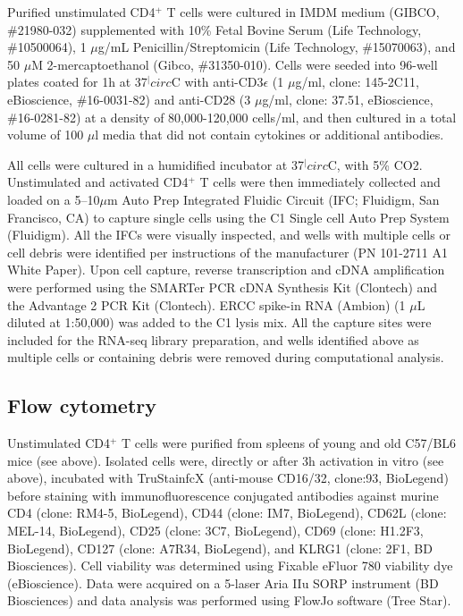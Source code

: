 Purified unstimulated CD4$^+$ T cells were cultured in IMDM medium (GIBCO, \#{}21980-032) supplemented with 10\% Fetal Bovine Serum (Life Technology, \#{}10500064), 1 $\mu$g/mL Penicillin/Streptomicin (Life Technology, \#{}15070063), and 50 $\mu$M 2-mercaptoethanol (Gibco, \#{}31350-010). Cells were seeded into 96-well plates coated for 1h at 37$^|circ$C with anti-CD3$\epsilon$ (1 $\mu$g/ml, clone: 145-2C11, eBioscience, \#{}16-0031-82) and anti-CD28 (3 $\mu$g/ml, clone: 37.51, eBioscience, \#{}16-0281-82) at a density of 80,000-120,000 cells/ml, and then cultured in a total volume of 100 $\mu$l media that did not contain cytokines or additional antibodies.  

All cells were cultured in a humidified incubator at 37$^|circ$C, with 5\% CO2. Unstimulated and activated CD4$^+$ T cells were then immediately collected and loaded on a 5–10$\mu$m Auto Prep Integrated Fluidic Circuit (IFC; Fluidigm, San Francisco, CA) to capture single cells using the C1 Single cell Auto Prep System (Fluidigm). All the IFCs were visually inspected, and wells with multiple cells or cell debris were identified per instructions of the manufacturer (PN 101-2711 A1 White Paper). Upon cell capture, reverse transcription and cDNA amplification were performed using the SMARTer PCR cDNA Synthesis Kit (Clontech) and the Advantage 2 PCR Kit (Clontech). ERCC spike-in RNA (Ambion) (1 $\mu$L diluted at 1:50,000) was added to the C1 lysis mix. All the capture sites were included for the RNA-seq library preparation, and wells identified above as multiple cells or containing debris were removed during computational analysis.

\subsection{Flow cytometry}
\label{appA.1:FACS}

Unstimulated CD4$^+$ T cells were purified from spleens of young and old C57/BL6 mice (see above). Isolated cells were, directly or after 3h activation in vitro (see above), incubated with TruStainfcX (anti-mouse CD16/32, clone:93, BioLegend) before staining with immunofluorescence conjugated antibodies against murine CD4 (clone: RM4-5, BioLegend), CD44 (clone: IM7, BioLegend), CD62L (clone: MEL-14, BioLegend), CD25 (clone: 3C7, BioLegend), CD69 (clone: H1.2F3, BioLegend), CD127 (clone: A7R34, BioLegend), and KLRG1 (clone: 2F1, BD Biosciences). Cell viability was determined using Fixable eFluor 780 viability dye (eBioscience). Data were acquired on a 5-laser Aria IIu SORP instrument (BD Biosciences) and data analysis was performed using FlowJo software (Tree Star).\\

